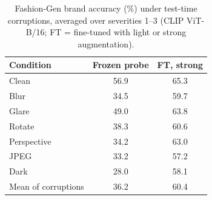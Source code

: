 \begin{table}[t]\centering\small
\caption{Fashion-Gen brand accuracy (\%) under test-time corruptions, averaged over severities 1--3 (CLIP ViT-B/16; FT = fine-tuned with light or strong augmentation).}\label{tab:robustness_fashiongen}
\begin{tabular}{lcc}\toprule
Condition & Frozen probe & FT, strong \\\midrule
Clean & 56.9 & 65.3 \\\midrule
Blur & 34.5 & 59.7 \\
Glare & 49.0 & 63.8 \\
Rotate & 38.3 & 60.6 \\
Perspective & 34.2 & 63.0 \\
JPEG & 33.2 & 57.2 \\
Dark & 28.0 & 58.1 \\
\midrule Mean of corruptions & 36.2 & 60.4 \\
\bottomrule\end{tabular}\end{table}
